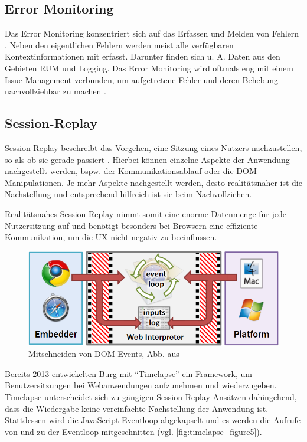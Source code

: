 \subsection{Error Monitoring}

Das Error Monitoring konzentriert sich auf das Erfassen und Melden von Fehlern \cite{CrashbinCrashMonitoring}. Neben den eigentlichen Fehlern werden meist alle verfügbaren Kontextinformationen mit erfasst. Darunter finden sich u. A. Daten aus den Gebieten RUM und Logging. Das Error Monitoring wird oftmals eng mit einem Issue-Management verbunden, um aufgetretene Fehler und deren Behebung nachvollziehbar zu machen \cite{CrashbinCrashMonitoring}.

\subsection{Session-Replay}

Session-Replay beschreibt das Vorgehen, eine Sitzung eines Nutzers nachzustellen, so als ob sie gerade passiert \cite{NoBoundariesExfiltrationBySessionReplayScripts}. Hierbei können einzelne Aspekte der Anwendung nachgestellt werden, bspw. der Kommunikationsablauf oder die DOM-Manipulationen. Je mehr Aspekte nachgestellt werden, desto realitätsnaher ist die Nachstellung und entsprechend hilfreich ist sie beim Nachvollziehen.

Realitätsnahes Session-Replay nimmt somit eine enorme Datenmenge für jede Nutzersitzung auf und benötigt besonders bei Browsern eine effiziente Kommunikation, um die UX nicht negativ zu beeinflussen.

\begin{figure}
\centering
\includegraphics[width=\linewidth]{img/03_methoden/timelapse_figure5.png}
\caption{Mitschneiden von DOM-Events, Abb. aus \cite{TimelapsePaper}}
\label{fig:timelapse_figure5}
\end{figure}

Bereits 2013 entwickelten Burg \etal \cite{TimelapsePaper} mit \enquote{Timelapse} ein Framework, um Benutzersitzungen bei Webanwendungen aufzunehmen und wiederzugeben. Timelapse unterscheidet sich zu gängigen Session-Replay-Ansätzen dahingehend, dass die Wiedergabe keine vereinfachte Nachstellung der Anwendung ist. Stattdessen wird die JavaScript-Eventloop abgekapselt und es werden die Aufrufe von und zu der Eventloop mitgeschnitten (vgl. \autoref{fig:timelapse_figure5}).

